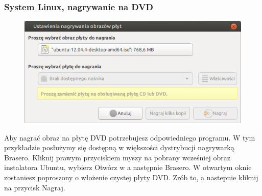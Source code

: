 \subsubsection{System Linux, nagrywanie na DVD}
\begin{figure}
		\includegraphics[width=\linewidth]{images/instalacja_nagrywanie_obrazu_linux_DVD.png}
\end{figure}
Aby nagrać obraz na płytę DVD potrzebujesz odpowiedniego programu. W tym przykładzie posłużymy się dostępną w większości dystrybucji nagrywarką Brasero. Kliknij prawym przyciskiem myszy na pobrany wcześniej obraz instalatora Ubuntu, wybierz Otwórz w a następnie Brasero. W otwartym oknie zostaniesz poproszony o włożenie czystej płyty DVD. Zrób to, a nastepnie kliknij na przycisk Nagraj.
\clearpage